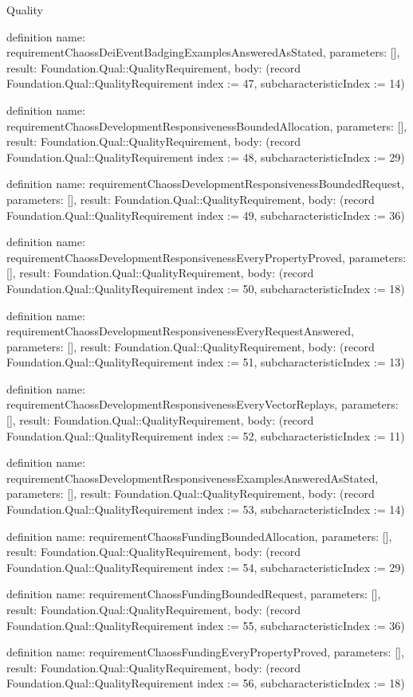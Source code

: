 \begin{lexlean}{Quality}
\begin{semanticmodule}
definition{
  name: requirementChaossDeiEventBadgingExamplesAnsweredAsStated,
  parameters: [],
  result: Foundation.Qual::QualityRequirement,
  body: (record Foundation.Qual::QualityRequirement {index := 47, subcharacteristicIndex := 14})
}

definition{
  name: requirementChaossDevelopmentResponsivenessBoundedAllocation,
  parameters: [],
  result: Foundation.Qual::QualityRequirement,
  body: (record Foundation.Qual::QualityRequirement {index := 48, subcharacteristicIndex := 29})
}

definition{
  name: requirementChaossDevelopmentResponsivenessBoundedRequest,
  parameters: [],
  result: Foundation.Qual::QualityRequirement,
  body: (record Foundation.Qual::QualityRequirement {index := 49, subcharacteristicIndex := 36})
}

definition{
  name: requirementChaossDevelopmentResponsivenessEveryPropertyProved,
  parameters: [],
  result: Foundation.Qual::QualityRequirement,
  body: (record Foundation.Qual::QualityRequirement {index := 50, subcharacteristicIndex := 18})
}

definition{
  name: requirementChaossDevelopmentResponsivenessEveryRequestAnswered,
  parameters: [],
  result: Foundation.Qual::QualityRequirement,
  body: (record Foundation.Qual::QualityRequirement {index := 51, subcharacteristicIndex := 13})
}

definition{
  name: requirementChaossDevelopmentResponsivenessEveryVectorReplays,
  parameters: [],
  result: Foundation.Qual::QualityRequirement,
  body: (record Foundation.Qual::QualityRequirement {index := 52, subcharacteristicIndex := 11})
}

definition{
  name: requirementChaossDevelopmentResponsivenessExamplesAnsweredAsStated,
  parameters: [],
  result: Foundation.Qual::QualityRequirement,
  body: (record Foundation.Qual::QualityRequirement {index := 53, subcharacteristicIndex := 14})
}

definition{
  name: requirementChaossFundingBoundedAllocation,
  parameters: [],
  result: Foundation.Qual::QualityRequirement,
  body: (record Foundation.Qual::QualityRequirement {index := 54, subcharacteristicIndex := 29})
}

definition{
  name: requirementChaossFundingBoundedRequest,
  parameters: [],
  result: Foundation.Qual::QualityRequirement,
  body: (record Foundation.Qual::QualityRequirement {index := 55, subcharacteristicIndex := 36})
}

definition{
  name: requirementChaossFundingEveryPropertyProved,
  parameters: [],
  result: Foundation.Qual::QualityRequirement,
  body: (record Foundation.Qual::QualityRequirement {index := 56, subcharacteristicIndex := 18})
}


\end{semanticmodule}
\end{lexlean}
